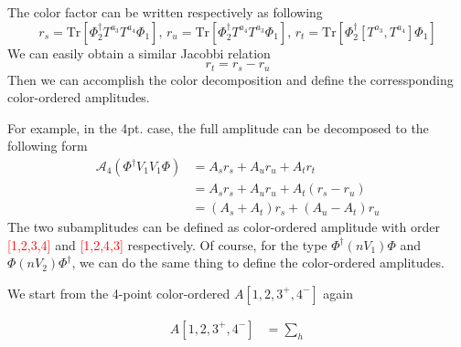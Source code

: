\documentclass[12pt]{article}
\begin{document}
    The color factor can be written respectively as following
    \begin{equation*}
        r_s=\mathrm{Tr}[\Phi_2^\dagger T^{a_3}T^{a_4}\Phi_1],\,r_u=\mathrm{Tr}[\Phi_2^\dagger T^{a_4}T^{a_3}\Phi_1],\,
        r_t=\mathrm{Tr}[\Phi_2^\dagger [T^{a_3},T^{a_4}]\Phi_1]
    \end{equation*}
    We can easily obtain a similar Jacobbi relation
    \begin{equation*}
        r_t=r_s-r_u
    \end{equation*}
    Then we can accomplish the color decomposition and define the corressponding color-ordered amplitudes.

    For example, in the 4pt. case, the full amplitude can be decomposed to the following form
        \begin{align*}
            \mathcal{A}_4(\Phi^\dagger V_1V_1\Phi)&=A_s r_s+A_u r_u+A_t r_t\\
            &=A_s r_s+A_u r_u+A_t(r_s-r_u)\\
            &=(A_s+A_t)r_s+(A_u-A_t)r_u
        \end{align*}
        The two subamplitudes can be defined as color-ordered amplitude with order \textcolor{red}{[1,2,3,4]} and 
        \textcolor{red}{[1,2,4,3]} respectively.
        Of course, for the type $\Phi^\dagger(nV_1)\Phi$ and $\Phi (nV_2) \Phi^\dagger$, we can do the same thing to define the color-ordered amplitudes.

    We start from the 4-point color-ordered $A[1,2,3^+,4^-]$ again
    \begin{center}
    \begin{minipage}{0.45\textwidth}
        \begin{align*}
        A[1,2,3^+,4^-] &= \sum_{h}
        \end{align*}
        \end{minipage}
        \hspace{-3em}
        \begin{minipage}{0.45\textwidth}
        \end{minipage}
    \end{center}
\end{document}
